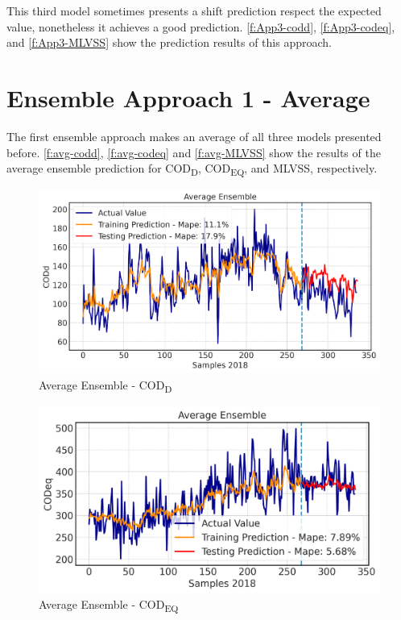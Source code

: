 This third model sometimes presents a shift prediction respect the expected value, nonetheless it achieves a good prediction. \autoref{f:App3-codd}, \autoref{f:App3-codeq}, and \autoref{f:App3-MLVSS} show the prediction results of this approach. 
\clearpage

\section{Ensemble Approach 1 - Average}
The first ensemble approach makes an average of all three models presented before. \autoref{f:avg-codd}, \autoref{f:avg-codeq} and \autoref{f:avg-MLVSS} show the results of the average ensemble prediction for COD\textsubscript{D}, COD\textsubscript{EQ}, and MLVSS, respectively. 

\begin{figure}[h]
\centering
\includegraphics[width=\linewidth]{figures/Ch5/CODd-avg.pdf}
\caption{Average Ensemble - COD\textsubscript{D}}
\label{f:avg-codd}
\end{figure}

\begin{figure}[h]
\centering
\includegraphics[width=\linewidth]{figures/Ch5/CODeq-avg.pdf}
\caption{Average Ensemble - COD\textsubscript{EQ}}
\label{f:avg-codeq}
\end{figure}

